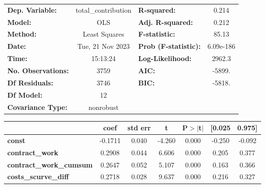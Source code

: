 \begin{center}
\begin{tabular}{lclc}
\toprule
\textbf{Dep. Variable:}                   & total\_contribution & \textbf{  R-squared:         } &     0.214   \\
\textbf{Model:}                           &         OLS         & \textbf{  Adj. R-squared:    } &     0.212   \\
\textbf{Method:}                          &    Least Squares    & \textbf{  F-statistic:       } &     85.13   \\
\textbf{Date:}                            &   Tue, 21 Nov 2023  & \textbf{  Prob (F-statistic):} & 6.09e-186   \\
\textbf{Time:}                            &       15:13:24      & \textbf{  Log-Likelihood:    } &    2962.3   \\
\textbf{No. Observations:}                &          3759       & \textbf{  AIC:               } &    -5899.   \\
\textbf{Df Residuals:}                    &          3746       & \textbf{  BIC:               } &    -5818.   \\
\textbf{Df Model:}                        &            12       & \textbf{                     } &             \\
\textbf{Covariance Type:}                 &      nonrobust      & \textbf{                     } &             \\
\bottomrule
\end{tabular}
\begin{tabular}{lcccccc}
                                          & \textbf{coef} & \textbf{std err} & \textbf{t} & \textbf{P$> |$t$|$} & \textbf{[0.025} & \textbf{0.975]}  \\
\midrule
\textbf{const}                            &      -0.1711  &        0.040     &    -4.260  &         0.000        &       -0.250    &       -0.092     \\
\textbf{contract\_work}                   &       0.2908  &        0.044     &     6.606  &         0.000        &        0.205    &        0.377     \\
\textbf{contract\_work\_cumsum}           &       0.2647  &        0.052     &     5.107  &         0.000        &        0.163    &        0.366     \\
\textbf{costs\_scurve\_diff}              &       0.2718  &        0.028     &     9.637  &         0.000        &        0.216    &        0.327     \\

\end{tabular}
\end{center}
